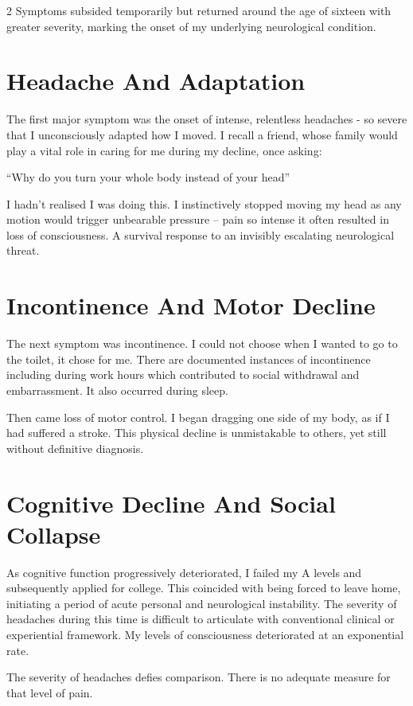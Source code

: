 \documentclass{article}
\begin{document}
\begin{multicols}{2}
Symptoms subsided temporarily but returned around the age of sixteen with greater severity, marking the onset of my underlying neurological condition.

\section*{Headache And Adaptation}
The first major symptom was the onset of intense, relentless headaches - so severe that I unconsciously adapted how I moved. I recall a friend, whose family would play a vital role in caring for me during my decline, once asking:
\begin{center}
“Why do you turn your whole body instead of your head”
\end{center}

I hadn’t realised I was doing this. I instinctively stopped moving my head as any motion would trigger unbearable pressure – pain so intense it often resulted in loss of consciousness. A survival response to an invisibly escalating neurological threat.

\section*{Incontinence And Motor Decline}
The next symptom was incontinence. I could not choose when I wanted to go to the toilet, it chose for me. There are documented instances of incontinence including during work hours which contributed to social withdrawal and embarrassment. It also occurred during sleep.

Then came loss of motor control. I began dragging one side of my body, as if I had suffered a stroke. This physical decline is unmistakable to others, yet still without definitive diagnosis.

\section*{Cognitive Decline And Social Collapse}
As cognitive function progressively deteriorated, I failed my A levels and subsequently applied for college. This coincided with being forced to leave home, initiating a period of acute personal and neurological instability. The severity of headaches during this time is difficult to articulate with conventional clinical or experiential framework. My levels of consciousness deteriorated at an exponential rate.
\begin{center}
The severity of headaches defies comparison. There is no adequate measure for that level of pain.
\end{center}
\end{multicols}
\end{document}
